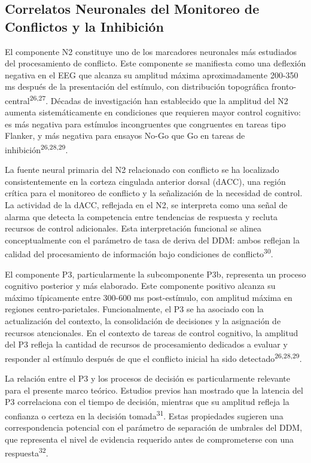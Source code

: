 \documentclass[
  spanish,
  10pt,
]{article}
\begin{document}
\subsection{Correlatos Neuronales del Monitoreo de Conflictos y la
Inhibición}\label{correlatos-neuronales-del-monitoreo-de-conflictos-y-la-inhibiciuxf3n}

El componente N2 constituye uno de los marcadores neuronales más
estudiados del procesamiento de conflicto. Este componente se manifiesta
como una deflexión negativa en el EEG que alcanza su amplitud máxima
aproximadamente 200-350 ms después de la presentación del estímulo, con
distribución topográfica fronto-central\textsuperscript{26,27}. Décadas
de investigación han establecido que la amplitud del N2 aumenta
sistemáticamente en condiciones que requieren mayor control cognitivo:
es más negativa para estímulos incongruentes que congruentes en tareas
tipo Flanker, y más negativa para ensayos No-Go que Go en tareas de
inhibición\textsuperscript{26,28,29}.

La fuente neural primaria del N2 relacionado con conflicto se ha
localizado consistentemente en la corteza cingulada anterior dorsal
(dACC), una región crítica para el monitoreo de conflicto y la
señalización de la necesidad de control. La actividad de la dACC,
reflejada en el N2, se interpreta como una señal de alarma que detecta
la competencia entre tendencias de respuesta y recluta recursos de
control adicionales. Esta interpretación funcional se alinea
conceptualmente con el parámetro de tasa de deriva del DDM: ambos
reflejan la calidad del procesamiento de información bajo condiciones de
conflicto\textsuperscript{30}.

El componente P3, particularmente la subcomponente P3b, representa un
proceso cognitivo posterior y más elaborado. Este componente positivo
alcanza su máximo típicamente entre 300-600 ms post-estímulo, con
amplitud máxima en regiones centro-parietales. Funcionalmente, el P3 se
ha asociado con la actualización del contexto, la consolidación de
decisiones y la asignación de recursos atencionales. En el contexto de
tareas de control cognitivo, la amplitud del P3 refleja la cantidad de
recursos de procesamiento dedicados a evaluar y responder al estímulo
después de que el conflicto inicial ha sido
detectado\textsuperscript{26,28,29}.

La relación entre el P3 y los procesos de decisión es particularmente
relevante para el presente marco teórico. Estudios previos han mostrado
que la latencia del P3 correlaciona con el tiempo de decisión, mientras
que su amplitud refleja la confianza o certeza en la decisión
tomada\textsuperscript{31}. Estas propiedades sugieren una
correspondencia potencial con el parámetro de separación de umbrales del
DDM, que representa el nivel de evidencia requerido antes de
comprometerse con una respuesta\textsuperscript{32}.
\end{document}
